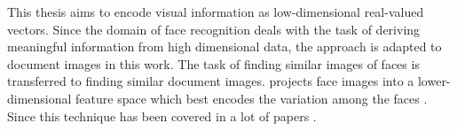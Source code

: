 This thesis aims to encode visual information as low-dimensional real-valued vectors.
Since the domain of face recognition deals with the task of deriving meaningful information from high dimensional data,
the \eigenfaces{} approach is adapted to document images in this work.
The task of finding similar images of faces is transferred to finding similar document images.
\eigenfaces{} projects face images into a lower-dimensional feature space which best encodes the variation among the faces \cite{eigenfaces1991}.
Since \citeyear{eigenfaces1991} this technique has been covered in a lot of papers 
\cite{eigenfaces1991, eigenfaces1997, eigenfaces2013, face-recognition2008, face-recognition2020, face-recognition2021}.